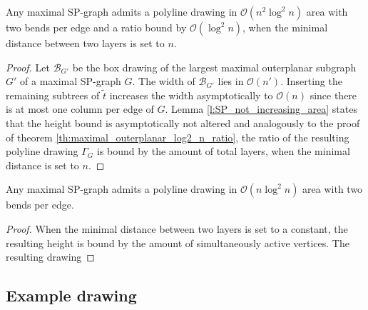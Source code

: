 
\begin{theorem}
	Any maximal SP-graph admits a polyline drawing in $\mathcal{O}(n^2 \log^2 n)$ area with two bends per edge and a ratio bound by $\mathcal{O}(\log^2 n)$, when the minimal distance between two layers is set to $n$.
\end{theorem}
\begin{proof}
	Let $\mathcal{B}_{G'}$ be the box drawing of the largest maximal outerplanar subgraph $G'$ of a maximal SP-graph $G$. The width of $\mathcal{B}_{G'}$ lies in $\mathcal{O}(n')$. Inserting the remaining subtrees of $\tilde{t}$ increases the width asymptotically to $\mathcal{O}(n)$ since there is at most one column per edge of $G$. Lemma \ref{l:SP_not_increasing_area} states that the height bound is asymptotically not altered and analogously to the proof of theorem \ref{th:maximal_outerplanar_log2_n_ratio}, the ratio of the resulting polyline drawing $\Gamma_G$ is bound by the amount of total layers, when the minimal distance is set to $n$.
\end{proof}
\begin{theorem}
	Any maximal SP-graph admits a polyline drawing in $\mathcal{O}(n \log^2 n)$ area with two bends per edge.
\end{theorem}
\begin{proof}
	When the minimal distance between two layers is set to a constant, the resulting height is bound by the amount of simultaneously active vertices. The resulting drawing 
\end{proof}

\subsection{Example drawing}

